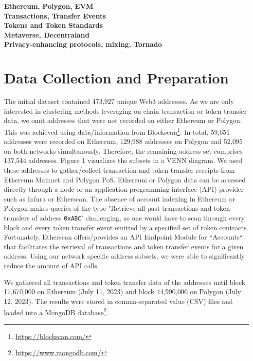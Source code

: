 \documentclass[12pt,a4paper,titlepage,oneside,english]{article}
\begin{document}
\textbf{Ethereum, Polygon, EVM}\\

\textbf{Transactions, Transfer Events}\\

\textbf{Tokens and Token Standards}\\

\textbf{Metaverse, Decentraland} \\

\textbf{Privacy-enhancing protocols, mixing, Tornado} \\




\section{Data Collection and Preparation}

The initial dataset contained 473,927 unique Web3 addresses. As we are only interested in clustering methods leveraging on-chain transaction or token transfer data, we omit addresses that were not recorded on either Ethereum or Polygon. This was achieved using data/information from Blockscan\footnote{\url{https://blockscan.com/}}. In total, 59,651 addresses were recorded on Ethereum, 129,988 addresses on Polygon and 52,095 on both networks simultanously. Therefore, the remaining address set comprises 137,544 addresses. Figure 1 visualizes the subsets in a VENN diagram. 
We used these addresses to gather/collect transaction and token transfer receipts from Ethereum Mainnet and Polygon PoS. Ethereum or Polygon data can be accessed directly through a node or an application programming interface (API) provider such as Infura or Etherscan. The absence of account indexing in Ethereum or Polygon makes queries of the type "Retrieve all past transactions and token transfers of address \texttt{0xABC}" challenging, as one would have to scan through every block and every token transfer event emitted by a specified set of token contracts. Fortunately, Etherscan offers/provides an API Endpoint Module for ``Accounts`` that facilitates the retrieval of transactions and token transfer events for a given address. Using our network specific address subsets, we were able to significantly reduce the amount of API calls. 

We gathered all transactions and token transfer data of the addresses until block 17,670,000 on Ethereum (July 11, 2023) and block 44,990,000 on Polygon (July 12, 2023). The results were stored in comma-separated value (CSV) files and loaded into a MongoDB database\footnote{\url{https://www.mongodb.com/}}.
\end{document}
